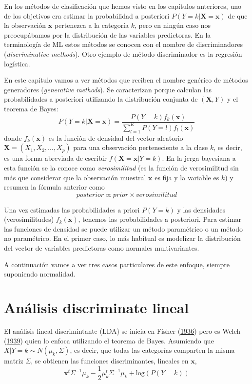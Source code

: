 \documentclass[
  spanish,
]{book}
\theoremstyle{break}
\theoremstyle{definition}
\theoremstyle{definition}
\theoremstyle{definition}
\theoremstyle{remark}
\begin{document}
En los métodos de clasificación que hemos visto en los capítulos anteriores, uno de los objetivos era estimar la probabilidad a posteriori \(P(Y = k | \mathbf{X}=\mathbf{x})\) de que la observación \(\mathbf{x}\) pertenezca a la categoría \(k\), pero en ningún caso nos preocupábamos por la distribución de las variables predictoras. En la terminología de ML estos métodos se conocen con el nombre de discriminadores (\emph{discriminative methods}). Otro ejemplo de método discriminador es la regresión logística.

En este capítulo vamos a ver métodos que reciben el nombre genérico de métodos generadores (\emph{generative methods}). Se caracterizan porque calculan las probabilidades a posteriori utilizando la distribución conjunta de \((\mathbf{X}, Y)\) y el teorema de Bayes:
\[P(Y = k | \mathbf{X}=\mathbf{x}) = \frac{P(Y = k) f_k(\mathbf{x})}{\sum_{l=1}^K P(Y = l) f_l(\mathbf{x})}\]
donde \(f_k(\mathbf{x})\) es la función de densidad del vector aleatorio \(\mathbf{X}=(X_1, X_2, \ldots, X_p)\) para una observación perteneciente a la clase \(k\), es decir, es una forma abreviada de escribir \(f(\mathbf{X}=\mathbf{x} | Y = k)\). En la jerga bayesiana a esta función se la conoce como \emph{verosimilitud} (es la función de verosimilitud sin más que considerar que la observación muestral \(\mathbf{x}\) es fija y la variable es \(k\)) y resumen la fórmula anterior como
\[posterior \propto prior \times verosimilitud\]

Una vez estimadas las probabilidades a priori \(P(Y = k)\) y las densidades (verosimilitudes) \(f_k(\mathbf{x})\), tenemos las probabilidades a posteriori. Para estimar las funciones de densidad se puede utilizar un método paramétrico o un método no paramétrico. En el primer caso, lo más habitual es modelizar la distribución del vector de variables predictoras como normales multivariantes.

A continuación vamos a ver tres casos particulares de este enfoque, siempre suponiendo normalidad.

\hypertarget{anuxe1lisis-discriminate-lineal}{%
\section{Análisis discriminate lineal}\label{anuxe1lisis-discriminate-lineal}}

El análisis lineal discrimintante (LDA) se inicia en Fisher (\protect\hyperlink{ref-fisher1936use}{1936}) pero es Welch (\protect\hyperlink{ref-welch1939note}{1939}) quien lo enfoca utilizando el teorema de Bayes. Asumiendo que \(X | Y = k \sim N(\mu_k, \Sigma)\), es decir, que todas las categorías comparten la misma matriz \(\Sigma\), se obtienen las funciones discriminantes, lineales en \(\mathbf{x}\),
\[\mathbf{x}^t \Sigma^{-1} \mu_k - \frac{1}{2} \mu_k^t \Sigma^{-1} \mu_k + \mbox{log}(P(Y = k))\]
\end{document}
